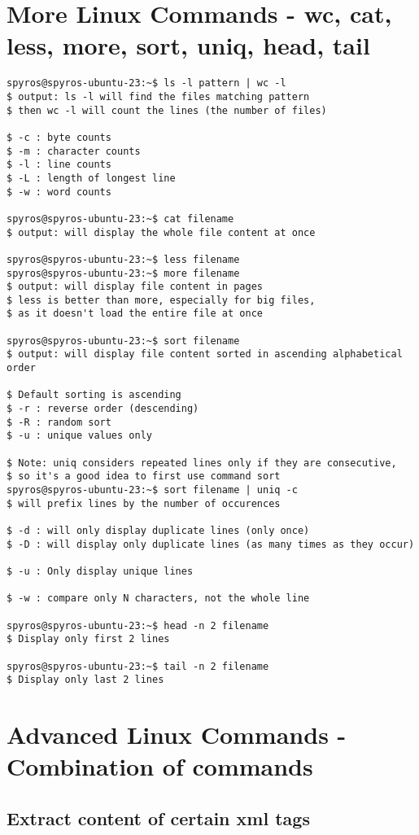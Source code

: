 \documentclass{article}
\begin{document}
\section{More Linux Commands - wc, cat, less, more, sort, uniq, head, tail}
\begin{lstlisting}
spyros@spyros-ubuntu-23:~$ ls -l pattern | wc -l
$ output: ls -l will find the files matching pattern
$ then wc -l will count the lines (the number of files)

$ -c : byte counts
$ -m : character counts
$ -l : line counts
$ -L : length of longest line
$ -w : word counts

spyros@spyros-ubuntu-23:~$ cat filename
$ output: will display the whole file content at once

spyros@spyros-ubuntu-23:~$ less filename
spyros@spyros-ubuntu-23:~$ more filename
$ output: will display file content in pages
$ less is better than more, especially for big files,
$ as it doesn't load the entire file at once

spyros@spyros-ubuntu-23:~$ sort filename
$ output: will display file content sorted in ascending alphabetical order

$ Default sorting is ascending
$ -r : reverse order (descending)
$ -R : random sort
$ -u : unique values only

$ Note: uniq considers repeated lines only if they are consecutive,
$ so it's a good idea to first use command sort
spyros@spyros-ubuntu-23:~$ sort filename | uniq -c
$ will prefix lines by the number of occurences

$ -d : will only display duplicate lines (only once)
$ -D : will display only duplicate lines (as many times as they occur)

$ -u : Only display unique lines

$ -w : compare only N characters, not the whole line

spyros@spyros-ubuntu-23:~$ head -n 2 filename
$ Display only first 2 lines

spyros@spyros-ubuntu-23:~$ tail -n 2 filename
$ Display only last 2 lines

\end{lstlisting}


\section{Advanced Linux Commands - Combination of commands}

\subsection{Extract content of certain xml tags}
\end{document}
